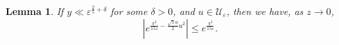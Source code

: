 \documentclass[11pt,reqno]{amsart}
\newtheorem{lemma}[theorem]{Lemma}
\theoremstyle{remark}
\numberwithin{equation}{section}
\renewcommand{\Re}{{\rm Re}}
\renewcommand{\Re}{{\rm Re}}
\renewcommand{\Im}{{\rm Im}}
\begin{document}
\begin{lemma}\label{lem:exp}
	If $y \ll \varepsilon^{\frac{2}{5}+\delta}$ for some $\delta>0$, and $u \in \mathcal{U}_{\varepsilon}$, then we have, as $z \to 0$, 
	\[	
		\left| e^{\frac{\pi^2}{15z} - \frac{\sqrt{5}\phi}{2}  u^2}\right| \leq e^{\frac{\pi^2}{15\varepsilon}}.
	\]
\end{lemma}
%
\end{document}
